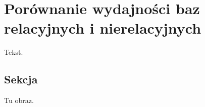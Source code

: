 \chapter{Porównanie wydajności baz relacyjnych i nierelacyjnych}

Tekst.

\section{Sekcja}

Tu obraz.



